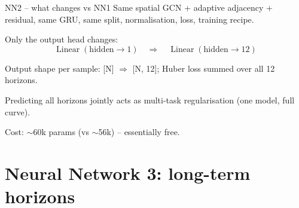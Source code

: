 \documentclass[aspectratio=169]{beamer}
\begin{document}
\begin{frame}{NN2 -- what changes vs NN1}
\small
Same spatial GCN + adaptive adjacency + residual, same GRU, same split,
normalisation, loss, training recipe.

\vspace{0.8em}
Only the output head changes:
\[
\operatorname{Linear}(\mathrm{hidden} \to 1)
\quad \Longrightarrow \quad
\operatorname{Linear}(\mathrm{hidden} \to 12)
\]

\vspace{0.4em}
Output shape per sample: [N] $\Rightarrow$ [N, 12]; Huber loss summed over all 12 horizons.

\vspace{0.8em}
Predicting all horizons jointly acts as multi-task regularisation (one model, full curve).

\vspace{0.8em}
Cost: $\sim$60k params (vs $\sim$56k) -- essentially free.
\end{frame}

\section[NN3]{Neural Network 3: long-term horizons}
\end{document}
